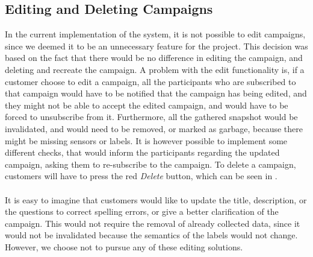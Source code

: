 
\FloatBarrier

\subsection{Editing and Deleting Campaigns}
\label{sub:editing_and_deleting_campaigns}

In the current implementation of the system, it is not possible to edit campaigns, since we deemed it to be an unnecessary feature for the project. This decision was based on the fact that there would be no difference in editing the campaign, and deleting and recreate the campaign. A problem with the edit functionality is, if a customer choose to edit a campaign, all the participants who are subscribed to that campaign would have to be notified that the campaign has being edited, and they might not be able to accept the edited campaign, and would have to be forced to unsubscribe from it. Furthermore, all the gathered snapshot would be invalidated, and would need to be removed, or marked as garbage, because there might be missing sensors or labels. It is however possible to implement some different checks, that would inform the participants regarding the updated campaign, asking them to re-subscribe to the campaign. To delete a campaign, customers will have to press the red \emph{Delete} button, which can be seen in . 
\\\\
It is easy to imagine that customers would like to update the title, description, or the questions to correct spelling errors, or give a better clarification of the campaign. This would not require the removal of already collected data, since it would not be invalidated because the semantics of the labels would not change. However, we choose not to pursue any of these editing solutions.

